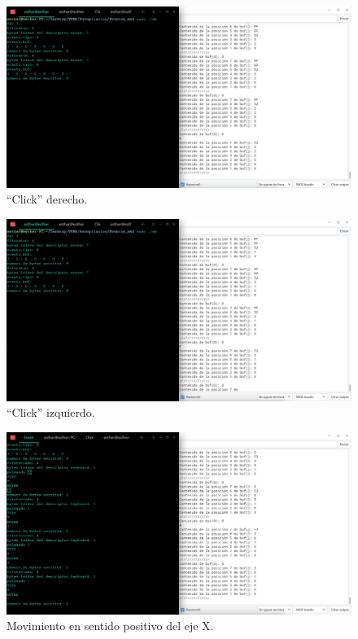     \begin{figure}
    \centering
    \includegraphics[scale = 0.5]{capitulo_04/figuras_dir/clickder2.jpg}
    \caption{``Click'' derecho.}
    \end{figure}

    \begin{figure}
    \centering
    \includegraphics[scale = 0.5]{capitulo_04/figuras_dir/clickizq2.jpg}
    \caption{``Click'' izquierdo.}
    \end{figure}

    \begin{figure}
    \centering
    \includegraphics[scale = 0.5]{capitulo_04/figuras_dir/movx+.jpg}
    \caption{Movimiento en sentido positivo del eje X.}
    \end{figure}

